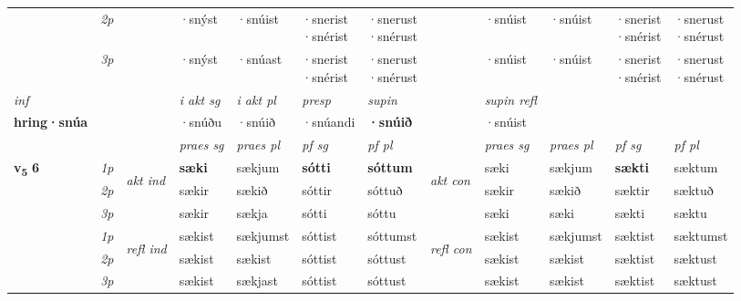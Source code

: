 \begin{longtable}[l]{X>{\footnotesize\itshape}llXXXXlXXXX}
 & 2p &  & ·snýst & ·snúist & \specialcell{·snerist\\  ·snérist} & \specialcell{·snerust\\  ·snérust} & &·snúist & ·snúist & \specialcell{·snerist\\  ·snérist} & \specialcell{·snerust\\  ·snérust} \\*
 & 3p  & & ·snýst & ·snúast & \specialcell{·snerist\\  ·snérist} & \specialcell{·snerust\\  ·snérust} & & ·snúist & ·snúist& \specialcell{·snerist\\  ·snérist} & \specialcell{·snerust\\  ·snérust} \\*
\cmidrule{4-7} \cmidrule{9-12}

   {\textit{inf}} & &  & \textit{i akt sg} & \textit{i akt pl}   & \textit{presp} & \textit{supin} && \textit{supin refl}  \\*
  {\textbf{hring\allowbreak ·snúa}} & && ·snúðu  & ·snúið   & ·snúandi &  \textbf{·snúið} && ·snúist  \\*

\midrule

 & &   & \textit{praes sg}  & \textit{praes pl}    & \textit{ pf sg} & \textit{pf pl} & & \textit{praes sg}  & \textit{praes pl}    & \textit{pf sg} & \textit{pf pl }  \\ \cmidrule{4-7} \cmidrule{9-12}
 \multirow{2}{*}{{{\textbf{v{\textsubscript{5}}} \Large{\textbf{6}}}}}  & 1p & \multirow{3}{*}{\begin{turn}{90}\textit{akt ind}\end{turn}} & \textbf{sæki} & sækjum & \textbf{sótti} & \textbf{sóttum} & \multirow{3}{*}{\begin{turn}{90}\textit{akt con}\end{turn}} &sæki & sækjum & \textbf{sækti} & sæktum\\*
 & 2p &  &  sækir  & sækið & sóttir & sóttuð & & sækir & sækið & sæktir & sæktuð \\*
 & 3p &  & sækir & sækja & sótti & sóttu & & sæki & sæki& sækti & sæktu \\*
\cmidrule{4-7} \cmidrule{9-12}
 & 1p & \multirow{3}{*}{\begin{turn}{90}\textit{refl ind}\end{turn}}  & sækist & sækjumst & sóttist & sóttumst & \multirow{3}{*}{\begin{turn}{90}\textit{refl con}\end{turn}}  &sækist & sækjumst & sæktist & sæktumst \\*
 & 2p &  & sækist & sækist & sóttist & sóttust & &sækist & sækist & sæktist & sæktust \\*
 & 3p  & & sækist & sækjast & sóttist & sóttust & & sækist & sækist& sæktist & sæktust \\*
\cmidrule{4-7} \cmidrule{9-12}


\end{longtable}
